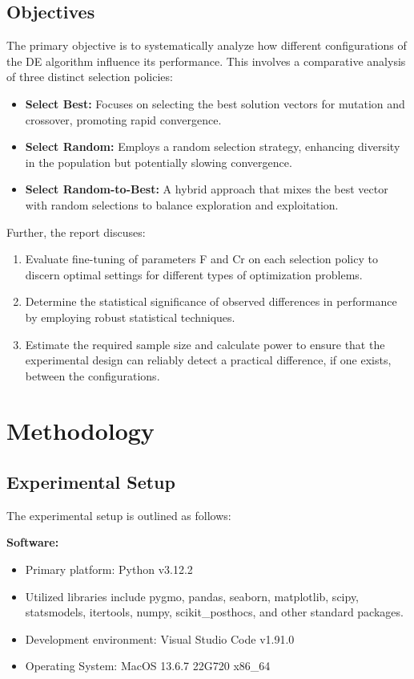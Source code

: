 \documentclass[12pt,a4paper]{article}
\begin{document}
\subsection{Objectives}
The primary objective is to systematically analyze how different configurations of the DE algorithm influence its performance. This involves a comparative analysis of three distinct selection policies:
\begin{itemize}
    \item \textbf{Select Best:} Focuses on selecting the best solution vectors for mutation and crossover, promoting rapid convergence.
    \item \textbf{Select Random:} Employs a random selection strategy, enhancing diversity in the population but potentially slowing convergence.
    \item \textbf{Select Random-to-Best:} A hybrid approach that mixes the best vector with random selections to balance exploration and exploitation.
\end{itemize}

Further, the report discuses:
\begin{enumerate}
    \item Evaluate fine-tuning of parameters F and Cr on each selection policy to discern optimal settings for different types of optimization problems.
    \item Determine the statistical significance of observed differences in performance by employing robust statistical techniques.
    \item Estimate the required sample size and calculate power to ensure that the experimental design can reliably detect a practical difference, if one exists, between the configurations.
\end{enumerate}

\newpage

\section{Methodology}

\subsection{Experimental Setup}
The experimental setup is outlined as follows:

\vspace{3mm}

\textbf{Software:}
\begin{itemize}
    \item Primary platform: Python v3.12.2
    \item Utilized libraries include pygmo, pandas, seaborn, matplotlib, scipy, statsmodels, itertools, numpy, scikit\_posthocs, and other standard packages.
    \item Development environment: Visual Studio Code v1.91.0
    \item Operating System: MacOS 13.6.7 22G720 x86\_64
\end{itemize}
\end{document}
